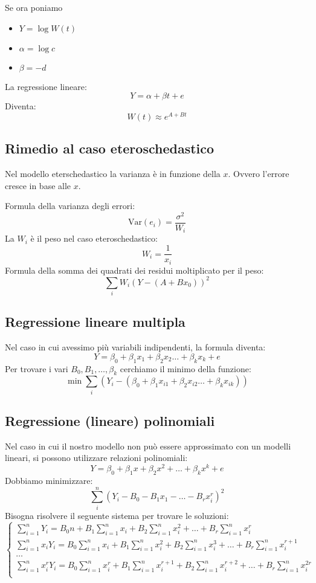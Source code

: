 Se ora poniamo
\begin{itemize}
\item 
$Y = \log{W(t)}$
\item 
$\alpha = \log{c}$
\item 
$\beta = -d$
\end{itemize}

La regressione lineare:
\[
 Y = \alpha + \beta t + e 
\]
Diventa:
\[
 W(t) \approx e^{A+Bt} 
\]\subsection{Rimedio al caso eteroschedastico}\label{sec:rimedio-al-caso-eteroschedastico}
Nel modello eterschedastico la varianza è in funzione della $x$.
Ovvero l'errore cresce in base alle $x$.

Formula della varianza degli errori:
\[
 \text{Var}(e_i)=\frac{\sigma^2}{W_i}
\]
La $W_i$ è il peso nel caso eteroschedastico:
\[
 W_i=\frac{1}{x_i}
\]
Formula della somma dei quadrati dei residui moltiplicato per il peso:
\[
 \sum_iW_i(Y-(A+Bx_0))^2 
\]\subsection{Regressione lineare multipla}\label{sec:regressione-lineare-multipla}
Nel caso in cui avessimo più variabili indipendenti, la formula diventa:
\[
Y = \beta_0 + \beta_1 x_1 + \beta_2 x_2 \ldots + \beta_k x_k +e
\]
Per trovare i vari $B_0, B_1,\ldots,\beta_k$ cerchiamo il minimo della funzione:
\[
 \min\sum_i(Y_i -(\beta_0+\beta_1x_{i1} + \beta_2x_{i2} \ldots + \beta_kx_{ik})) 
\]\subsection{Regressione (lineare) polinomiali}\label{sec:regressione-lineare-polinomiali}
Nel caso in cui il nostro modello non può essere approssimato con un modelli lineari, si possono utilizzare relazioni polinomiali:
\[
 Y = \beta_0 + \beta_1x+\beta_2x^2 +\ldots+\beta_kx^k + e
\]
Dobbiamo minimizzare:
\[
 \sum_i^n (Y_i-B_0-B_1x_1-\ldots-B_rx_i^r)^2 
\]
Bisogna risolvere il seguente sistema per trovare le soluzioni:
\[
 \begin{cases}
\displaystyle\sum_{i=1}^nY_i=B_0n+B_1\sum_{i=1}^nx_i+B_2\sum_{i=1}^nx_i^2+\ldots+B_r\sum_{i=1}^nx_i^r \\
\displaystyle \sum_{i=1}^nx_iY_i = B_0\sum_{i=1}^nx_i+B_1\sum_{i=1}^nx_i^2+B_2\sum_{i=1}^nx_i^3+\ldots+B_r\sum_{i=1}^nx_i^{r+1} \\
\displaystyle \ldots \\
\displaystyle \sum_{i=1}^nx_i^rY_i = B_0\sum_{i=1}^nx_i^r+B_1\sum_{i=1}^nx_i^{r+1}+B_2\sum_{i=1}^nx_i^{r+2}+\ldots+B_r\sum_{i=1}^nx_i^{2r} \\
\end{cases}
\]